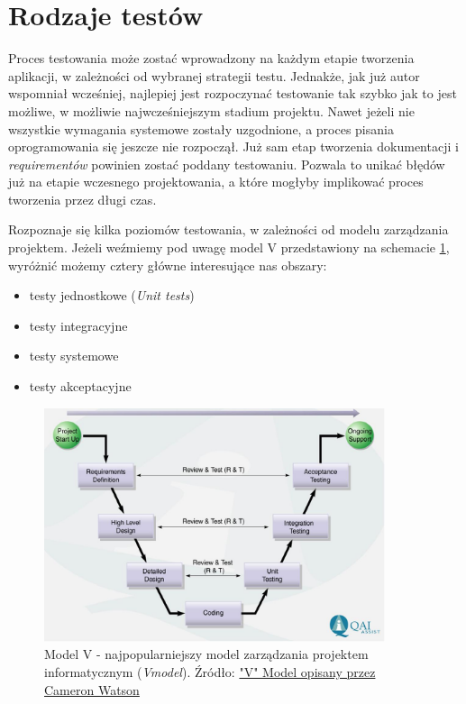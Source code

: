 \section{Rodzaje testów}
Proces testowania może zostać wprowadzony na każdym etapie tworzenia aplikacji, w zależności od wybranej strategii testu. Jednakże, jak już autor wspomniał wcześniej, najlepiej jest rozpoczynać testowanie tak szybko jak to jest możliwe, w możliwie najwcześniejszym stadium projektu. Nawet jeżeli nie wszystkie wymagania systemowe zostały uzgodnione, a proces pisania oprogramowania się jeszcze nie rozpoczął. Już sam etap tworzenia dokumentacji i \textit{requirementów} powinien zostać poddany testowaniu. Pozwala to unikać błędów już na etapie wczesnego projektowania, a które mogłyby implikować proces tworzenia przez długi czas.

Rozpoznaje się kilka poziomów testowania, w zależności od modelu zarządzania projektem. Jeżeli weźmiemy pod uwagę model V przedstawiony na schemacie \ref{fig:model_v}, wyróżnić możemy cztery główne interesujące nas obszary:

\begin{itemize}
\item
testy jednostkowe (\textit{Unit tests})
\item
testy integracyjne
\item
testy systemowe
\item
testy akceptacyjne

\end{itemize}

\begin{figure}[!htb]
    \centering
    \includegraphics[width=10cm]{imgs/ch2_model_v.jpg}
    \caption{Model V - najpopularniejszy model zarządzania projektem informatycznym (\textit{V\-model}). Źródło: \href{http://www.projectinsight.net/blogs/it-project-management-solutions/the-quot-v-quot-model-by-cameron-watson}{"V" Model opisany przez Cameron Watson}}
    \label{fig:model_v}
\end{figure} 

